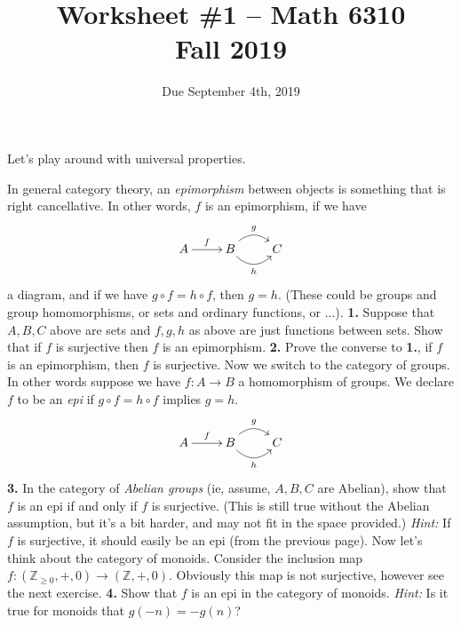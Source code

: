 \documentclass[11pt]{amsart}
\theoremstyle{theorem}
\renewcommand{\to}[1][]{\xrightarrow{\ #1\ }}
\newcommand{\bZ}{\mathbb{Z}}
\begin{document}
\title{Worksheet \#1 -- Math 6310\\Fall 2019}
\author{Due September 4th, 2019}
\maketitle
Let's play around with universal properties.

In general category theory, an \emph{epimorphism} between objects is something that is right cancellative.  In other words, $f$ is an epimorphism, if we have
\[
\xymatrix{
A \ar[r]^f & B \ar@/_1pc/[r]_h \ar@/^1pc/[r]^g & C
}
\]
a diagram, and if we have $g \circ f = h \circ f$, then $g = h$.  (These could be groups and group homomorphisms, or sets and ordinary functions, or ...).
\vskip 9pt
\noindent
{\bf 1.}  Suppose that $A, B, C$ above are sets and $f,g,h$ as above are just functions between sets.  Show that if $f$ is surjective then $f$ is an epimorphism.
\vskip 170pt
\noindent
{\bf 2.}  Prove the converse to {\bf 1.}, if $f$ is an epimorphism, then $f$ is surjective.
\newpage
Now we switch to the category of groups.  In other words suppose we have $f : A \to B$ a homomorphism of groups.  We declare $f$ to be an \emph{epi} if $g \circ f = h \circ f$ implies $g = h$.
\[
\xymatrix{
A \ar[r]^f & B \ar@/_1pc/[r]_h \ar@/^1pc/[r]^g & C
}
\]
\vskip 9pt
\noindent
{\bf 3.}  In the category of \emph{Abelian groups} (ie, assume, $A,B,C$ are Abelian), show that $f$ is an epi if and only if $f$ is surjective.  (This is still true without the Abelian assumption, but it's a bit harder, and may not fit in the space provided.)
\vskip 3pt
\emph{Hint:}  If $f$ is surjective, it should easily be an epi (from the previous page).
\vskip 175pt
Now let's think about the category of monoids.  Consider the inclusion map $f : (\bZ_{\geq 0}, +, 0) \to (\bZ, + , 0)$.  Obviously this map is not surjective, however see the next exercise.
\vskip 9pt
\noindent
{\bf 4.}  Show that $f$ is an epi in the category of monoids.
\vskip 3pt
\emph{Hint:} Is it true for monoids that $g(-n) = -g(n)$?
\end{document}
